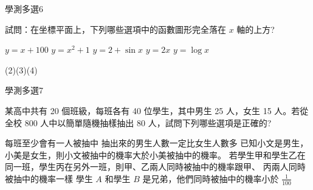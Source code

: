 \begin{QUESTIONS}
    \begin{QUESTION}
        \begin{ExamInfo}{97}{學測}{多選}{6}
        \end{ExamInfo}
        \begin{ExamAnsRateInfo}{56}{92}{58}{18}
        \end{ExamAnsRateInfo}
        \begin{QBODY}
            試問：在坐標平面上，下列哪些選項中的函數圖形完全落在 $x$ 軸的上方? 
			\begin{QOPS} 
				\QOP $y=x+100$
				\QOP $y=x^2+1$ 
				\QOP $y=2+\sin x$
				\QOP $y=2x$
				\QOP $y=\log x$
			\end{QOPS}
        \end{QBODY}
        \begin{QFROMS}
        \end{QFROMS}
        \begin{QTAGS}\end{QTAGS}
        \begin{QANS}
            (2)(3)(4)
        \end{QANS}
        \begin{QSOLLIST}
        \end{QSOLLIST}
        \begin{QEMPTYSPACE}
        \end{QEMPTYSPACE}
    \end{QUESTION}
    \begin{QUESTION}
        \begin{ExamInfo}{97}{學測}{多選}{7}
        \end{ExamInfo}
        \begin{ExamAnsRateInfo}{39}{60}{40}{17}
        \end{ExamAnsRateInfo}
        \begin{QBODY}
            某高中共有 20 個班級，每班各有 40 位學生，其中男生 25 人，女生 15 人。若從全校 800 人中以簡單隨機抽樣抽出 80 人，試問下列哪些選項是正確的? 
			\begin{QOPS} 
				\QOP 每班至少會有一人被抽中 
				\QOP 抽出來的男生人數一定比女生人數多 
				\QOP 已知小文是男生，小美是女生，則小文被抽中的機率大於小美被抽中的機率。 
				\QOP 若學生甲和學生乙在同一班，學生丙在另外一班，則甲、乙兩人同時被抽中的機率跟甲、 丙兩人同時被抽中的機率一樣 
				\QOP 學生 $A$ 和學生 $B$ 是兄弟，他們同時被抽中的機率小於 $\frac{1}{100}$
            \end{QOPS}

\end{QBODY}
\end{QUESTION}
\end{QUESTIONS}
